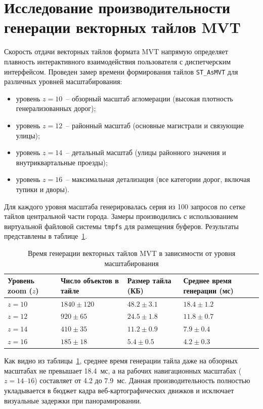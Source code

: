 \section{Исследование производительности генерации векторных тайлов MVT}
\label{sec:mvt_benchmark}

Скорость отдачи векторных тайлов формата MVT напрямую определяет плавность интерактивного взаимодействия пользователя с диспетчерским интерфейсом. Проведен замер времени формирования тайлов \texttt{ST\_AsMVT} для различных уровней масштабирования:
\begin{itemize}
    \item уровень $z=10$~-- обзорный масштаб агломерации (высокая плотность генерализованных дорог);
    \item уровень $z=12$~-- районный масштаб (основные магистрали и связующие улицы);
    \item уровень $z=14$~-- детальный масштаб (улицы районного значения и внутриквартальные проезды);
    \item уровень $z=16$~-- максимальная детализация (все категории дорог, включая тупики и дворы).
\end{itemize}

Для каждого уровня масштаба генерировалась серия из 100 запросов по сетке тайлов центральной части города. Замеры производились с использованием виртуальной файловой системы \texttt{tmpfs} для размещения буферов. Результаты представлены в таблице~\ref{tab:mvt_perf}.

\begin{table}[htbp]
\small
\centering
\caption{Время генерации векторных тайлов MVT в зависимости от уровня масштабирования}
\label{tab:mvt_perf}
\begin{tabularx}{\linewidth}{|l|l|l|X|}
\hline
\textbf{Уровень zoom ($z$)} & \textbf{Число объектов в тайле} & \textbf{Размер тайла (КБ)} & \textbf{Среднее время генерации (мс)} \\ \hline
$z=10$ & $1840 \pm 120$ & $48.2 \pm 3.1$ & $18.4 \pm 1.2$ \\ \hline
$z=12$ & $920 \pm 65$ & $24.5 \pm 1.8$ & $11.8 \pm 0.7$ \\ \hline
$z=14$ & $410 \pm 35$ & $11.2 \pm 0.9$ & $7.9 \pm 0.4$ \\ \hline
$z=16$ & $185 \pm 18$ & $5.4 \pm 0.5$ & $4.2 \pm 0.3$ \\ \hline
\end{tabularx}
\end{table}

Как видно из таблицы~\ref{tab:mvt_perf}, среднее время генерации тайла даже на обзорных масштабах не превышает 18.4~мс, а на рабочих навигационных масштабах ($z=14$--$16$) составляет от 4.2 до 7.9~мс. Данная производительность полностью укладывается в бюджет кадра веб-картографических движков и исключает визуальные задержки при панорамировании.

